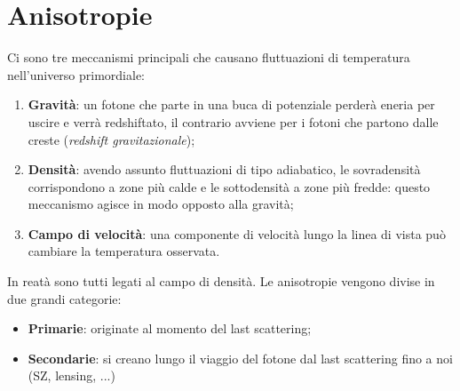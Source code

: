 \section{Anisotropie}
Ci sono tre meccanismi principali che causano fluttuazioni di temperatura nell'universo primordiale:
\begin{enumerate}
    \item \textbf{Gravità}: un fotone che parte in una buca di potenziale perderà eneria per uscire e verrà redshiftato, il contrario avviene per i fotoni che partono dalle creste (\textit{redshift gravitazionale});
    \item \textbf{Densità}: avendo assunto fluttuazioni di tipo adiabatico, le sovradensità corrispondono a zone più calde e le sottodensità a zone più fredde: questo meccanismo agisce in modo opposto alla gravità;
    \item \textbf{Campo di velocità}: una componente di velocità lungo la linea di vista può cambiare la temperatura osservata.
\end{enumerate}
In reatà sono tutti legati al campo di densità. Le anisotropie vengono divise in due grandi categorie:
\begin{itemize}
    \item \textbf{Primarie}: originate al momento del last scattering;
    \item \textbf{Secondarie}: si creano lungo il viaggio del fotone dal last scattering fino a noi (SZ, lensing, ...)
\end{itemize}

